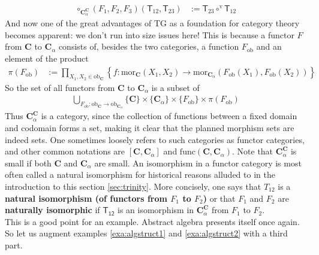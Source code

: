 \begin{align*}
  \circ_{\mathbf{C}_{\alpha}^{\mathbf{C}}}(F_{1},F_{2},F_{3})
  (\mathsf{T}_{12},\mathsf{T}_{23})
  &:=
  \mathsf{T}_{23}
  \circ^{\textrm{v}}
  \mathsf{T}_{12}
\end{align*}
And now one of the great advantages of TG as a foundation for category theory becomes apparent: we don't run into size issues here!
This is because a functor $F$ from $\mathbf{C}$ to $\mathbf{C}_{\alpha}$ consists of, besides the two categories, a function $F_{\mathrm{ob}}$ and an element of the product
\begin{align*}
  \pi(F_{\mathrm{ob}})
  &:=
  \prod_{X_{1},X_{2} \in \mathrm{ob}_{\mathbf{C}}}
  \left\lbrace
    f
    \colon
    \mathrm{mor}_{\mathbf{C}}(X_{1},X_{2})
    \rightarrow
    \mathrm{mor}_{\mathbf{C}_{\alpha}}
    (F_{\mathrm{ob}}(X_{1}),F_{\mathrm{ob}}(X_{2}))
  \right\rbrace
\end{align*}
So the set of all functors from $\mathbf{C}$ to $\mathbf{C}_{\alpha}$ is a subset of
\begin{align*}
  \bigcup_{F_{\mathrm{ob}} \colon \mathrm{ob}_{\mathbf{C}} \rightarrow \mathrm{ob}_{\mathbf{C}_{\alpha}}}
  \lbrace
    \mathbf{C}
  \rbrace
  \times
  \lbrace
    \mathbf{C}_{\alpha}
  \rbrace
  \times
  \lbrace
    F_{\mathrm{ob}}
  \rbrace
  \times
  \pi(F_{\mathrm{ob}})
\end{align*}
Thus $\mathbf{C}_{\alpha}^{\mathbf{C}}$ is a category, since the collection of functions between a fixed domain and codomain forms a set, making it clear that the planned morphism sets are indeed sets.
One sometimes loosely refers to such categories as functor categories, and other common notations are $[\mathbf{C},\mathbf{C}_{\alpha}]$ and $\mathrm{func}(\mathbf{C},\mathbf{C}_{\alpha})$.
Note that $\mathbf{C}_{\alpha}^{\mathbf{C}}$ is small if both $\mathbf{C}$ and $\mathbf{C}_{\alpha}$ are small.
An isomorphism in a functor category is most often called a natural isomorphism for historical reasons alluded to in the introduction to this section \ref{sec:trinity}.
More concisely, one says that $T_{12}$ is a \textbf{natural isomorphism (of functors from $F_{1}$ to $F_{2}$)} or that $F_{1}$ and $F_{2}$ are \textbf{naturally isomorphic} if $\mathsf{T_{12}}$ is an isomorphism in $\mathbf{C}_{\alpha}^{\mathbf{C}}$ from $F_{1}$ to $F_{2}$.
\\
This is a good point for an example.
Abstract algebra presents itself once again.
So let us augment examples \ref{exa:algstruct1} and \ref{exa:algstruct2} with a third part.
\\
